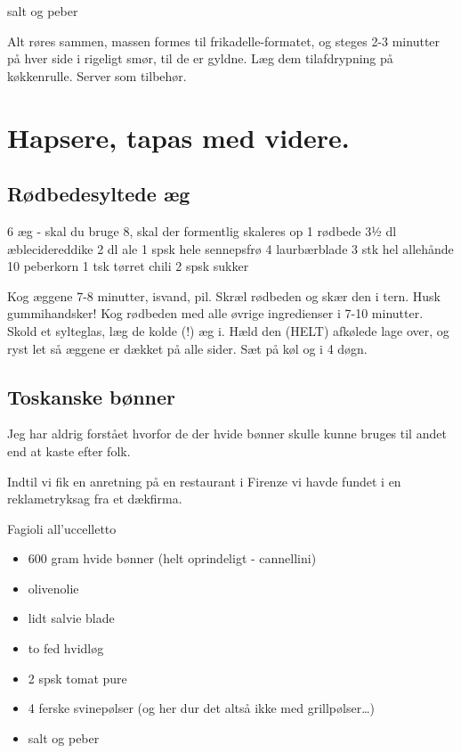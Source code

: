 \documentclass[
]{book}
\providecommand{\tightlist}{%
  \setlength{\itemsep}{0pt}\setlength{\parskip}{0pt}}
\begin{document}
salt og peber

Alt røres sammen, massen formes til frikadelle-formatet, og steges 2-3 minutter på hver side i rigeligt smør, til de er gyldne. Læg dem tilafdrypning på køkkenrulle. Server som tilbehør.

\chapter{Hapsere, tapas med videre.}\label{hapsere-tapas-med-videre.}

\section{Rødbedesyltede æg}\label{ruxf8dbedesyltede-uxe6g}

6 æg - skal du bruge 8, skal der formentlig skaleres op
1 rødbede
3½ dl æblecidereddike
2 dl ale
1 spsk hele sennepsfrø
4 laurbærblade
3 stk hel allehånde
10 peberkorn
1 tsk tørret chili
2 spsk sukker

Kog æggene 7-8 minutter, isvand, pil.
Skræl rødbeden og skær den i tern. Husk gummihandsker!
Kog rødbeden med alle øvrige ingredienser i 7-10 minutter.
Skold et sylteglas, læg de kolde (!) æg i. Hæld den (HELT)
afkølede lage over, og ryst let så æggene er dækket på alle sider.
Sæt på køl og i 4 døgn.

\section{Toskanske bønner}\label{toskanske-buxf8nner}

Jeg har aldrig forstået hvorfor de der hvide bønner skulle kunne bruges til
andet end at kaste efter folk.

Indtil vi fik en anretning på en restaurant i Firenze vi havde fundet i en
reklametryksag fra et dækfirma.

Fagioli all'uccelletto

\begin{itemize}
\tightlist
\item
  600 gram hvide bønner (helt oprindeligt - cannellini)
\item
  olivenolie
\item
  lidt salvie blade
\item
  to fed hvidløg
\item
  2 spsk tomat pure
\item
  4 ferske svinepølser (og her dur det altså ikke med grillpølser\ldots)
\item
  salt og peber
\end{itemize}
\end{document}
